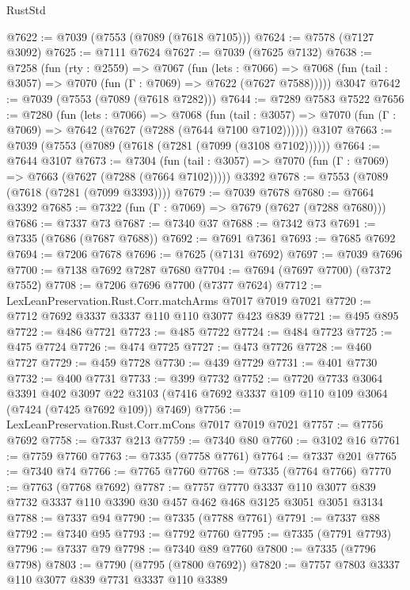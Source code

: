 \begin{lexlean}{RustStd}
\begin{coremodule}
{\begin{coremodule}
{{{{{{{{{{{{{{{{{{{{{{{{{{{{{{{{@7622 := @7039 (@7553 (@7089 (@7618 @7105)))
@7624 := @7578 (@7127 @3092)
@7625 := @7111 @7624
@7627 := @7039 (@7625 @7132)
@7638 := @7258
    (fun (rty : @2559) =>
    @7067
      (fun (lets : @7066) =>
      @7068 (fun (tail : @3057) => @7070 (fun (Γ : @7069) => @7622 (@7627 @7588)))))
    @3047
@7642 := @7039 (@7553 (@7089 (@7618 @7282)))
@7644 := @7289 @7583 @7522
@7656 := @7280
    (fun (lets : @7066) =>
    @7068
      (fun (tail : @3057) => @7070 (fun (Γ : @7069) => @7642 (@7627 (@7288 (@7644 @7100 @7102))))))
    @3107
@7663 := @7039 (@7553 (@7089 (@7618 (@7281 (@7099 (@3108 @7102))))))
@7664 := @7644 @3107
@7673 := @7304
    (fun (tail : @3057) => @7070 (fun (Γ : @7069) => @7663 (@7627 (@7288 (@7664 @7102)))))
    @3392
@7678 := @7553 (@7089 (@7618 (@7281 (@7099 @3393))))
@7679 := @7039 @7678
@7680 := @7664 @3392
@7685 := @7322 (fun (Γ : @7069) => @7679 (@7627 (@7288 @7680)))
@7686 := @7337 @73
@7687 := @7340 @37
@7688 := @7342 @73
@7691 := @7335 (@7686 (@7687 @7688))
@7692 := @7691 @7361
@7693 := @7685 @7692
@7694 := @7206 @7678
@7696 := @7625 (@7131 @7692)
@7697 := @7039 @7696
@7700 := @7138 @7692 @7287 @7680
@7704 := @7694 (@7697 @7700) (@7372 @7552)
@7708 := @7206 @7696 @7700 (@7377 @7624)
@7712 := LexLeanPreservation.Rust.Corr.matchArms @7017 @7019 @7021
@7720 := @7712 @7692 @3337 @3337 @110 @110 @3077 @423 @839
@7721 := @495 @895
@7722 := @486 @7721
@7723 := @485 @7722
@7724 := @484 @7723
@7725 := @475 @7724
@7726 := @474 @7725
@7727 := @473 @7726
@7728 := @460 @7727
@7729 := @459 @7728
@7730 := @439 @7729
@7731 := @401 @7730
@7732 := @400 @7731
@7733 := @399 @7732
@7752 := @7720
    @7733
    @3064
    @3391
    @402
    @3097
    @22
    @3103
    (@7416 @7692 @3337 @109 @110 @109 @3064 (@7424 (@7425 @7692 @109)) @7469)
@7756 := LexLeanPreservation.Rust.Corr.mCons @7017 @7019 @7021
@7757 := @7756 @7692
@7758 := @7337 @213
@7759 := @7340 @80
@7760 := @3102 @16
@7761 := @7759 @7760
@7763 := @7335 (@7758 @7761)
@7764 := @7337 @201
@7765 := @7340 @74
@7766 := @7765 @7760
@7768 := @7335 (@7764 @7766)
@7770 := @7763 (@7768 @7692)
@7787 := @7757
    @7770
    @3337
    @110
    @3077
    @839
    @7732
    @3337
    @110
    @3390
    @30
    @457
    @462
    @468
    @3125
    @3051
    @3051
    @3134
@7788 := @7337 @94
@7790 := @7335 (@7788 @7761)
@7791 := @7337 @88
@7792 := @7340 @95
@7793 := @7792 @7760
@7795 := @7335 (@7791 @7793)
@7796 := @7337 @79
@7798 := @7340 @89 @7760
@7800 := @7335 (@7796 @7798)
@7803 := @7790 (@7795 (@7800 @7692))
@7820 := @7757
    @7803
    @3337
    @110
    @3077
    @839
    @7731
    @3337
    @110
    @3389
}}}}}}}}}}}}}}}}}}}}}}}}}}}}}}}}
\end{coremodule}}
\end{coremodule}
\end{lexlean}
